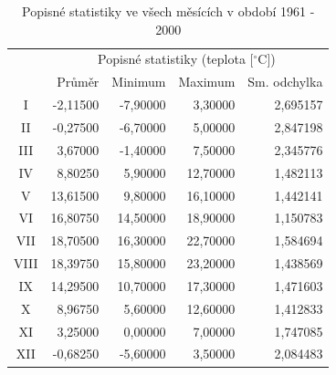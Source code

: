 \documentclass{article}
\newcommand{\Celsius}{$^\circ$C}
\begin{document}
  \begin{table}[ht]\centering \renewcommand{\arraystretch}{1.4}
 	\caption{Popisné statistiky ve všech měsících v období 1961 - 2000}
 	\begin{tabular}{@{}crrrr@{}}\toprule
 		       & \multicolumn{4}{c}{Popisné statistiky (teplota [\Celsius])} \\ 
 		       & Průměr   & Minimum  & Maximum  & Sm. odchylka \\ \midrule
 		  I    & -2,11500 & -7,90000 & 3,30000  & 2,695157     \\ %
 		  II   & -0,27500 & -6,70000 & 5,00000  & 2,847198     \\ %
 		  III  & 3,67000  & -1,40000 & 7,50000  & 2,345776     \\ %
 		  IV   & 8,80250  & 5,90000  & 12,70000 & 1,482113     \\ %
 		  V    & 13,61500 & 9,80000  & 16,10000 & 1,442141     \\ %
 		  VI   & 16,80750 & 14,50000 & 18,90000 & 1,150783     \\ %
 		  VII  & 18,70500 & 16,30000 & 22,70000 & 1,584694     \\ %
 		  VIII & 18,39750 & 15,80000 & 23,20000 & 1,438569     \\ %
 		  IX   & 14,29500 & 10,70000 & 17,30000 & 1,471603     \\ %
 		  X    & 8,96750  & 5,60000  & 12,60000 & 1,412833     \\ %
 		  XI   & 3,25000  & 0,00000  & 7,00000  & 1,747085     \\ %
 		  XII  & -0,68250 & -5,60000 & 3,50000  & 2,084483     \\ \bottomrule
 	\end{tabular}
 \end{table}
\end{document}

